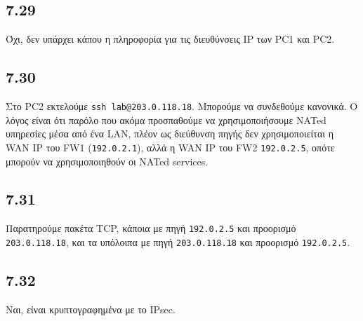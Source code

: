 \documentclass[a4paper, 12pt]{article}
\begin{document}
	\subsection*{7.29}
		Όχι, δεν υπάρχει κάπου η πληροφορία για τις διευθύνσεις IP των PC1 και PC2.

	\subsection*{7.30}
	 	Στο PC2 εκτελούμε \verb|ssh lab@203.0.118.18|. Μπορούμε να συνδεθούμε κανονικά. Ο λόγος είναι ότι παρόλο που ακόμα προσπαθούμε να χρησιμοποιήσουμε NATed υπηρεσίες μέσα από ένα LAN, πλέον ως διεύθυνση πηγής δεν χρησιμοποιείται η WAN IP του FW1 (\verb|192.0.2.1|), αλλά η WAN IP του FW2 \verb|192.0.2.5|, οπότε μπορούν να χρησιμοποιηθούν οι NATed services.
		
	\subsection*{7.31}
		Παρατηρούμε πακέτα TCP, κάποια με πηγή \verb|192.0.2.5| και προορισμό \verb|203.0.118.18|, και τα υπόλοιπα με πηγή \verb|203.0.118.18| και προορισμό \verb|192.0.2.5|.	
	
	\subsection*{7.32} 
		Ναι, είναι κρυπτογραφημένα με το IPsec.
\end{document}
